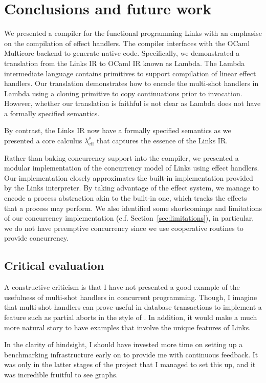 \documentclass[12pt,mscres,cdtppar,twoside,openright,logo,rightchapter,normalheadings]{infthesis}
\theoremstyle{definition}
\newcommand{\Calc}{\ensuremath{\lambda_{\text{eff}}^\rho}\xspace}
\begin{document}
\chapter{Conclusions and future work}
\label{ch:conclusions}

We presented a compiler for the functional programming Links with an
emphasise on the compilation of effect handlers. The compiler
interfaces with the OCaml Multicore backend to generate native
code. Specifically, we demonstrated a translation from the Links IR to
OCaml IR known as Lambda.  The Lambda intermediate language contains
primitives to support compilation of linear effect handlers. Our
translation demonstrates how to encode the multi-shot handlers in
Lambda using a cloning primitive to copy continuations prior to
invocation. However, whether our translation is faithful is not clear
as Lambda does not have a formally specified semantics.

By contrast, the Links IR now have a formally specified semantics as
we presented a core calculus \Calc{} that captures the essence of the
Links IR.

Rather than baking concurrency support into the compiler, we presented
a modular implementation of the concurrency model of Links using
effect handlers. Our implementation closely approximates the built-in
implementation provided by the Links interpreter. By taking advantage
of the effect system, we manage to encode a process abstraction akin
to the built-in one, which tracks the effects that a process may
perform. We also identified some shortcomings and limitations of our
concurrency implementation (c.f. Section~\ref{sec:limitations}), in
particular, we do not have preemptive concurrency since we use
cooperative routines to provide concurrency.

\section{Critical evaluation}
\label{sec:criticaleval}

A constructive criticism is that I have not presented a good example
of the usefulness of multi-shot handlers in concurrent
programming. Though, I imagine that multi-shot handlers can prove
useful in database transactions to implement a feature such as partial
aborts in the style of \cite{Le2015}. In addition, it would make a
much more natural story to have examples that involve the unique
features of Links.

In the clarity of hindsight, I should have invested more time on
setting up a benchmarking infrastructure early on to provide me with
continuous feedback. It was only in the latter stages of the project
that I managed to set this up, and it was incredible fruitful to see
graphs.
\end{document}
